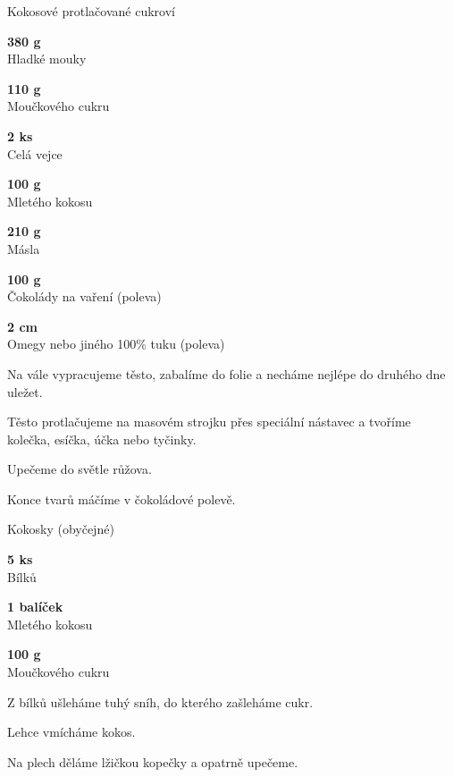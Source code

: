 \documentclass[11pt,a4paper]{article}
\begin{document}
\begin{recipe}[DodgerBlue]{Kokosové protlačované cukroví}
    \begin{ingredients}
        \item \parbox[t]{\linewidth}{\raggedright \weight \textbf{380 g}\\ Hladké mouky}
        \item \parbox[t]{\linewidth}{\raggedright \weight \textbf{110 g}\\ Moučkového cukru}
        \item \parbox[t]{\linewidth}{\raggedright \piece \textbf{2 ks}\\ Celá vejce}
        \item \parbox[t]{\linewidth}{\raggedright \weight \textbf{100 g}\\ Mletého kokosu}
        \item \parbox[t]{\linewidth}{\raggedright \weight \textbf{210 g}\\ Másla}
        \item \parbox[t]{\linewidth}{\raggedright \weight \textbf{100 g}\\ Čokolády na vaření (poleva)}
        \item \parbox[t]{\linewidth}{\raggedright \weight \textbf{2 cm}\\ Omegy nebo jiného 100\% tuku (poleva)}
    \end{ingredients}
    \begin{steps}
        \item Na vále vypracujeme těsto, zabalíme do folie a necháme nejlépe do druhého dne uležet.
        \item Těsto protlačujeme na masovém strojku přes speciální nástavec a tvoříme kolečka, esíčka, účka nebo tyčinky.
        \item Upečeme do světle růžova.
        \item Konce tvarů máčíme v čokoládové polevě.
    \end{steps}
\end{recipe}

\begin{recipe}[PowderBlue]{Kokosky (obyčejné)}
    \begin{ingredients}
        \item \parbox[t]{\linewidth}{\raggedright \piece \textbf{5 ks}\\ Bílků}
        \item \parbox[t]{\linewidth}{\raggedright \piece \textbf{1 balíček}\\ Mletého kokosu}
        \item \parbox[t]{\linewidth}{\raggedright \weight \textbf{100 g}\\ Moučkového cukru}
    \end{ingredients}
    \begin{steps}
        \item Z bílků ušleháme tuhý sníh, do kterého zašleháme cukr.
        \item Lehce vmícháme kokos.
        \item Na plech děláme lžičkou kopečky a opatrně upečeme.
    \end{steps}
\end{recipe}
\end{document}
